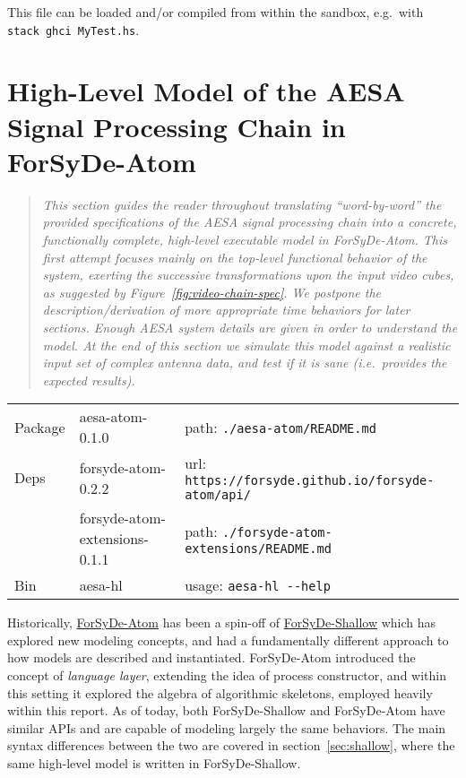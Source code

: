 \documentclass[
  a4paper,
]{article}
\begin{document}
This file can be loaded and/or compiled from within the sandbox,
e.g.~with \texttt{stack\ ghci\ MyTest.hs}.

\clearpage

\hypertarget{sec:atom}{%
\section{High-Level Model of the AESA Signal Processing Chain in
ForSyDe-Atom}\label{sec:atom}}

\begin{quote}
\emph{This section guides the reader throughout translating
``word-by-word'' the provided specifications of the AESA signal
processing chain into a concrete, functionally complete, high-level
executable model in ForSyDe-Atom. This first attempt focuses mainly on
the top-level functional behavior of the system, exerting the successive
transformations upon the input video cubes, as suggested by
Figure~\ref{fig:video-chain-spec}. We postpone the
description/derivation of more appropriate time behaviors for later
sections. Enough AESA system details are given in order to understand
the model. At the end of this section we simulate this model against a
realistic input set of complex antenna data, and test if it is sane
(i.e.~provides the expected results).}
\end{quote}

\begin{longtable}[]{@{}lll@{}}
\toprule
\endhead
Package & aesa-atom-0.1.0 & path:
\texttt{./aesa-atom/README.md}\tabularnewline
Deps & forsyde-atom-0.2.2 & url:
\texttt{https://forsyde.github.io/forsyde-atom/api/}\tabularnewline
& forsyde-atom-extensions-0.1.1 & path:
\texttt{./forsyde-atom-extensions/README.md}\tabularnewline
Bin & aesa-hl & usage: \texttt{aesa-hl\ -\/-help}\tabularnewline
\bottomrule
\end{longtable}

Historically,
\href{https://forsyde.github.io/forsyde-atom/}{ForSyDe-Atom} has been a
spin-off of
\href{https://forsyde.github.io/forsyde-shallow/}{ForSyDe-Shallow} which
has explored new modeling concepts, and had a fundamentally different
approach to how models are described and instantiated. ForSyDe-Atom
introduced the concept of \emph{language layer}, extending the idea of
process constructor, and within this setting it explored the algebra of
algorithmic skeletons, employed heavily within this report. As of today,
both ForSyDe-Shallow and ForSyDe-Atom have similar APIs and are capable
of modeling largely the same behaviors. The main syntax differences
between the two are covered in section~\ref{sec:shallow}, where the same
high-level model is written in ForSyDe-Shallow.
\end{document}
